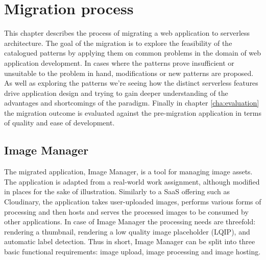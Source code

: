 \chapter{Migration process}

This chapter describes the process of migrating a web application to serverless architecture. The goal of the migration is to explore the feasibility of the catalogued patterns by applying them on common problems in the domain of web application development. In cases where the patterns prove insufficient or unsuitable to the problem in hand, modifications or new patterns are proposed. As well as exploring the patterns we're seeing how the distinct serverless features drive application design and trying to gain deeper understanding of the advantages and shortcomings of the paradigm. Finally in chapter \ref{cha:evaluation} the migration outcome is evaluated against the pre-migration application in terms of quality and ease of development.

\section{Image Manager}

The migrated application, Image Manager, is a tool for managing image assets. The application is adapted from a real-world work assignment, although modified in places for the sake of illustration. Similarly to a SaaS offering such as Cloudinary, the application takes user-uploaded images, performs various forms of processing and then hosts and serves the processed images to be consumed by other applications. In case of Image Manager the processing needs are threefold: rendering a thumbnail, rendering a low quality image placeholder (LQIP), and automatic label detection. Thus in short, Image Manager can be split into three basic functional requirements: image upload, image processing and image hosting.

